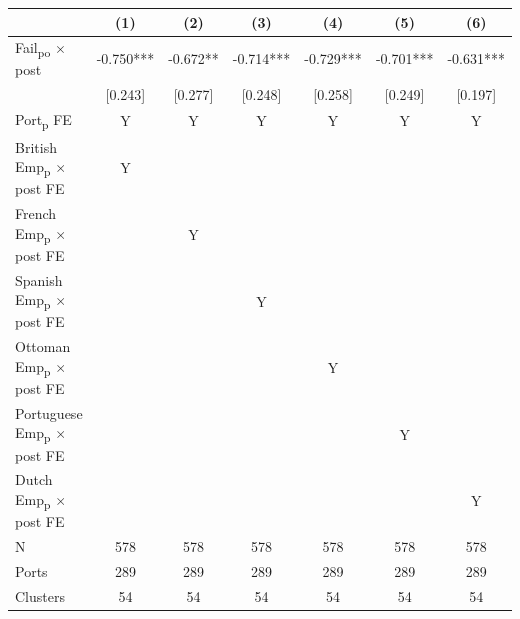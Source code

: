 {
\def\sym#1{\ifmmode^{#1}\else\(^{#1}\)\fi}
\begin{tabular}{l*{6}{c}}
\toprule
            &\multicolumn{1}{c}{(1)}   &\multicolumn{1}{c}{(2)}   &\multicolumn{1}{c}{(3)}   &\multicolumn{1}{c}{(4)}   &\multicolumn{1}{c}{(5)}   &\multicolumn{1}{c}{(6)}   \\
\midrule
Fail\textsubscript{po} $\times$ post&      -0.750***&      -0.672** &      -0.714***&      -0.729***&      -0.701***&      -0.631***\\
            &     [0.243]   &     [0.277]   &     [0.248]   &     [0.258]   &     [0.249]   &     [0.197]   \\
Port\textsubscript{p} FE&           Y   &           Y   &           Y   &           Y   &           Y   &           Y   \\
British Emp\textsubscript{p} $\times$ post FE&           Y   &               &               &               &               &               \\
French Emp\textsubscript{p} $\times$ post FE&               &           Y   &               &               &               &               \\
Spanish Emp\textsubscript{p} $\times$ post FE&               &               &           Y   &               &               &               \\
Ottoman Emp\textsubscript{p} $\times$ post FE&               &               &               &           Y   &               &               \\
Portuguese Emp\textsubscript{p} $\times$ post FE&               &               &               &               &           Y   &               \\
Dutch Emp\textsubscript{p} $\times$ post FE&               &               &               &               &               &           Y   \\
\midrule
N           &         578   &         578   &         578   &         578   &         578   &         578   \\
Ports       &         289   &         289   &         289   &         289   &         289   &         289   \\
Clusters    &          54   &          54   &          54   &          54   &          54   &          54   \\
\bottomrule
\end{tabular}
}
